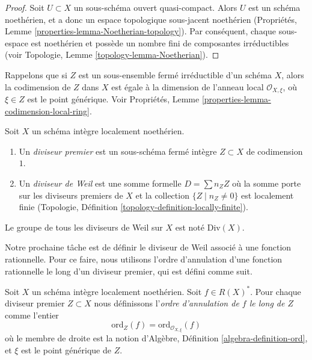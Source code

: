 \begin{proof}
Soit  $U \subset X$  un sous-schéma ouvert quasi-compact. Alors  $U$  est un
schéma noethérien, et a donc un espace topologique sous-jacent noethérien
(Propriétés, Lemme  \ref{properties-lemma-Noetherian-topology}). Par conséquent, chaque sous-espace est
noethérien et possède un nombre fini de composantes irréductibles (voir Topologie,
Lemme  \ref{topology-lemma-Noetherian}).
\end{proof}

\noindent
Rappelons que si  $Z$  est un sous-ensemble fermé irréductible d'un schéma
 $X$, alors la codimension de  $Z$  dans  $X$  est égale à
la dimension de l'anneau local  $\mathcal{O}_{X, \xi}$, où  $\xi \in Z$  est le point
générique. Voir Propriétés, Lemme  \ref{properties-lemma-codimension-local-ring}.

\begin{definition}
\label{definition-Weil-divisor}
Soit  $X$  un schéma intègre localement noethérien.
\begin{enumerate}
\item Un  {\it  diviseur premier}  est un sous-schéma fermé
intègre  $Z \subset X$  de codimension  $1$.
\item Un {\it diviseur de Weil}  est une somme formelle
 $D = \sum n_Z Z$ où la somme porte sur les diviseurs premiers de $X$  et la
collection  $\{Z \mid n_Z \not = 0\}$ est localement finie (Topologie, Définition \ref{topology-definition-locally-finite}).
\end{enumerate}
Le groupe de tous les diviseurs de Weil sur  $X$  est noté  $\text{Div}(X)$.
\end{definition}

\noindent
Notre prochaine tâche est de définir le diviseur de Weil associé à une fonction
rationnelle. Pour ce faire, nous utilisons l'ordre d'annulation d'une fonction
rationnelle le long d'un diviseur premier, qui est défini comme suit.

\begin{definition}
\label{definition-order-vanishing}
Soit $X$ un schéma intègre localement noethérien. Soit $f \in R(X)^*$.
Pour chaque diviseur premier $Z \subset X$ nous définissons
l'{\it ordre d'annulation de $f$ le
long de $Z$} comme l'entier
$$
\text{ord}_Z(f) = \text{ord}_{\mathcal{O}_{X, \xi}}(f)
$$
où le membre de droite est la notion d'Algèbre, Définition  \ref{algebra-definition-ord}, et  $\xi$
est le point générique de  $Z$.
\end{definition}

